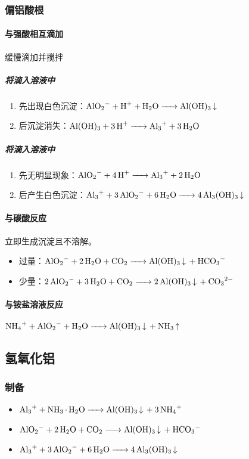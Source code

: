 \documentclass[a4paper]{article}
\begin{document}
	\subsubsection{偏铝酸根}
	\paragraph{与强酸相互滴加}缓慢滴加并搅拌
	\subparagraph{将滴入溶液中}
	\begin{enumerate}
		\item 先出现白色沉淀：$\ce{AlO2- + H+ + H2O -> Al(OH)3 v}\\$
		\item 后沉淀消失：$\ce{Al(OH)3 + 3H+ -> Al3+ + 3H2O}\\$
	\end{enumerate}
	\subparagraph{将滴入溶液中}
	\begin{enumerate}
		\item 先无明显现象：$\ce{AlO2- + 4H+ -> Al3+ + 2H2O}\\$
		\item 后产生白色沉淀：$\ce{Al3+ + 3AlO2- + 6H2O -> 4Al3(OH)3 v}\\$
	\end{enumerate}
	\paragraph{与碳酸反应}
	立即生成沉淀且不溶解。
	\begin{itemize}
		\item {}过量：$\ce{AlO2- + 2H2O + CO2 -> Al(OH)3 v + HCO3-}\\$
		\item {}少量：$\ce{2AlO2- + 3H2O + CO2 -> 2Al(OH)3 v + CO3^2-}\\$
	\end{itemize}
	\paragraph{与铵盐溶液反应}
	$\ce{NH4+ + AlO2- + H2O -> Al(OH)3 v + NH3 ^}\\$
	
	\subsection{氢氧化铝}
	\subsubsection{制备}
	\begin{itemize}
		\item $\ce{Al3+ + NH3*H2O -> Al(OH)3 v + 3NH4+}\\$
		\item $\ce{AlO2- + 2H2O + CO2 -> Al(OH)3 v + HCO3-}\\$
		\item $\ce{Al3+ + 3AlO2- + 6H2O -> 4Al3(OH)3 v}\\$
	\end{itemize}
	
\end{document}
